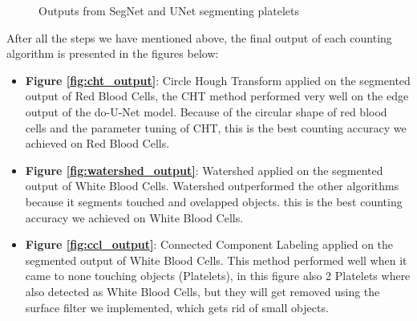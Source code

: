 \begin{figure}[H]
\centering
\begin{minipage}{.5\textwidth}
  \centering
\end{minipage}%
\begin{minipage}{.5\textwidth}
  \centering
\end{minipage}
  \caption{Outputs from SegNet and UNet segmenting platelets}
\end{figure}

After all the steps we have mentioned above, the final output of each counting algorithm is presented in the figures below:

\begin{itemize}
  \item \textbf{Figure \ref{fig:cht_output}}: Circle Hough Transform applied on the segmented output of Red Blood Cells, the CHT method performed very well on the edge output of the do-U-Net model.
    Because of the circular shape of red blood cells and the parameter tuning of CHT, this is the best counting accuracy we achieved on Red Blood Cells.
  \item \textbf{Figure \ref{fig:watershed_output}}: Watershed applied on the segmented output of White Blood Cells. Watershed outperformed the other algorithms because it segments touched and ovelapped objects. this is the best counting accuracy we achieved on White Blood Cells.
  \item \textbf{Figure \ref{fig:ccl_output}}: Connected Component Labeling applied on the segmented output of White Blood Cells. This method performed well when it came to none touching objects (Platelets), in this figure also 2 Platelets where also detected as White Blood Cells, but they will get removed using the surface filter we implemented, which gets rid of small objects.
\end{itemize}

